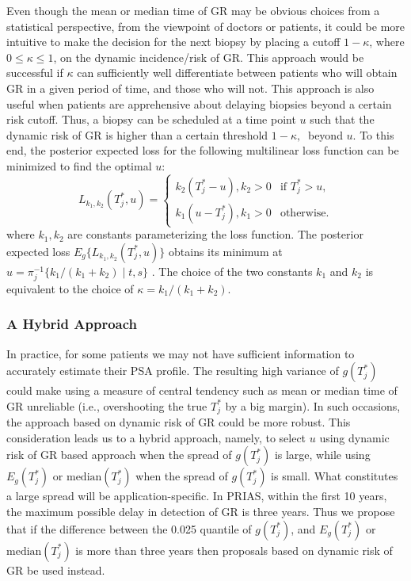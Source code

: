 Even though the mean or median time of GR may be obvious choices from a statistical perspective, from the viewpoint of doctors or patients, it could be more intuitive to make the decision for the next biopsy by placing a cutoff $1 - \kappa$, where $0 \leq \kappa \leq 1$, on the dynamic incidence/risk of GR. This approach would be successful if $\kappa$ can sufficiently well differentiate between patients who will obtain GR in a given period of time, and those who will not. This approach is also useful when patients are apprehensive about delaying biopsies beyond a certain risk cutoff. Thus, a biopsy can be scheduled at a time point $u$ such that the dynamic risk of GR is higher than a certain threshold $1 - \kappa,\ $ beyond $u$. To this end, the posterior expected loss for the following multilinear loss function can be minimized to find the optimal $u$:
\begin{equation}
\label{eq : loss_dynamic_risk}
L_{k_1, k_2}(T^*_j, u) =
    \begin{cases}
      k_2(T^*_j-u), k_2>0 & \text{if } T^*_j > u,\\
      k_1(u-T^*_j), k_1>0 & \text{otherwise}.
    \end{cases}       
\end{equation}
where $k_1, k_2$ are constants parameterizing the loss function. The posterior expected loss $E_g\big\{L_{k_1, k_2}(T^*_j, u)\big\}$ obtains its minimum at $u = \pi_j^{-1}\big\{k_1/{(k_1 + k_2)} \mid t,s \big\}$ \citep{robertBayesianChoice}. The choice of the two constants $k_1$ and $k_2$ is equivalent to the choice of $\kappa = {k_1}/{(k_1 + k_2)}$.

\subsubsection{A Hybrid Approach}
\label{subsubsec : mixed_approach}
In practice, for some patients we may not have sufficient information to accurately estimate their PSA profile. The resulting high variance of $g(T^*_j)$ could make using a measure of central tendency such as mean or median time of GR unreliable (i.e., overshooting the true $T_j^*$ by a big margin). In such occasions, the approach based on dynamic risk of GR could be more robust. This consideration leads us to a hybrid approach, namely, to select $u$ using dynamic risk of GR based approach when the spread of $g(T_j^*)$ is large, while using $E_g(T^*_j)$ or $\mbox{median}(T^*_j)$ when the spread of $g(T_j^*)$ is small. What constitutes a large spread will be application-specific. In PRIAS, within the first 10 years, the maximum possible delay in detection of GR is three years. Thus we propose that if the difference between the 0.025 quantile of $g(T^*_j)$, and $E_g(T^*_j)$ or $\mbox{median}(T^*_j)$ is more than three years then proposals based on dynamic risk of GR be used instead.